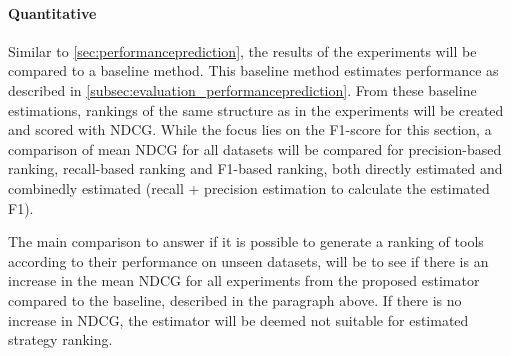 \paragraph{Quantitative} Similar to \autoref{sec:performanceprediction}, the results of the experiments will be compared to a baseline method. This baseline method estimates performance as described in \autoref{subsec:evaluation_performanceprediction}. From these baseline estimations, rankings of the same structure as in the experiments will be created and scored with NDCG. While the focus lies on the F1-score for this section, a comparison of mean NDCG for all datasets will be compared for precision-based ranking, recall-based ranking and F1-based ranking, both directly estimated and combinedly estimated (recall + precision estimation to calculate the estimated F1).

The main comparison to answer if it is possible to generate a ranking of tools according to their performance on unseen datasets, will be to see if there is an increase in the mean NDCG for all experiments from the proposed estimator compared to the baseline, described in the paragraph above. If there is no increase in NDCG, the estimator will be deemed not suitable for estimated strategy ranking. 
